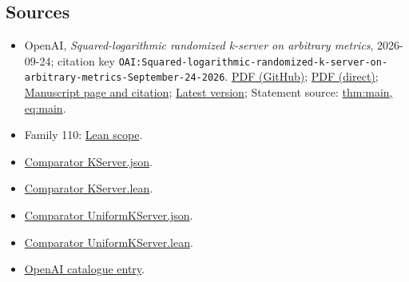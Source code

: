 \documentclass[11pt]{article}
\begin{document}
\subsection{Sources}
\begin{itemize}
\item OpenAI, \emph{Squared-logarithmic randomized k-server on arbitrary metrics}, 2026-09-24; citation key \texttt{OAI:Squared-logarithmic-randomized-k-server-on-arbitrary-metrics-September-24-2026}. \href{https://github.com/openai/math/blob/adc7f1241b42e322a6451854ab7e4b4c146bf78a/preprints/Squared-logarithmic-randomized-k-server-on-arbitrary-metrics-September-24-2026/Squared-logarithmic-randomized-k-server-on-arbitrary-metrics-September-24-2026.pdf}{PDF (GitHub)}; \href{https://github.com/openai/math/raw/adc7f1241b42e322a6451854ab7e4b4c146bf78a/preprints/Squared-logarithmic-randomized-k-server-on-arbitrary-metrics-September-24-2026/Squared-logarithmic-randomized-k-server-on-arbitrary-metrics-September-24-2026.pdf}{PDF (direct)}; \href{https://github.com/openai/math/blob/adc7f1241b42e322a6451854ab7e4b4c146bf78a/preprints/Squared-logarithmic-randomized-k-server-on-arbitrary-metrics-September-24-2026/README.md}{Manuscript page and citation}; \href{https://github.com/openai/math/blob/main/preprints/Squared-logarithmic-randomized-k-server-on-arbitrary-metrics-September-24-2026/Squared-logarithmic-randomized-k-server-on-arbitrary-metrics-September-24-2026.pdf}{Latest version}; Statement source: \href{https://github.com/openai/math/blob/adc7f1241b42e322a6451854ab7e4b4c146bf78a/preprints/Squared-logarithmic-randomized-k-server-on-arbitrary-metrics-September-24-2026/build/source/latex/sections/01\_introduction.tex\#L21}{thm:main, eq:main}.
\item Family 110: \href{https://github.com/openai/math/blob/adc7f1241b42e322a6451854ab7e4b4c146bf78a/lean/docs/110.md}{Lean scope}.
\item \href{https://github.com/openai/math/blob/adc7f1241b42e322a6451854ab7e4b4c146bf78a/lean/ComparatorChallenges/KServer.json}{Comparator KServer.json}.
\item \href{https://github.com/openai/math/blob/adc7f1241b42e322a6451854ab7e4b4c146bf78a/lean/ComparatorChallenges/KServer.lean}{Comparator KServer.lean}.
\item \href{https://github.com/openai/math/blob/adc7f1241b42e322a6451854ab7e4b4c146bf78a/lean/ComparatorChallenges/UniformKServer.json}{Comparator UniformKServer.json}.
\item \href{https://github.com/openai/math/blob/adc7f1241b42e322a6451854ab7e4b4c146bf78a/lean/ComparatorChallenges/UniformKServer.lean}{Comparator UniformKServer.lean}.
\item \href{https://github.com/openai/math/blob/adc7f1241b42e322a6451854ab7e4b4c146bf78a/CONTENTS.md}{OpenAI catalogue entry}.
\end{itemize}
\end{document}
